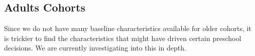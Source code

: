 \documentclass[12pt]{article}
\begin{document}
\subsection{Adults Cohorts}
Since we do not have many baseline characteristics available for older cohorts, it is trickier to find the characteristics that might have driven certain preschool decisions. We are currently investigating into this in depth.

\clearpage
\singlespacing
\listoftables

%
%
%

%
%
%

%
%
%

%
%
%

%
%
%

%
%
%
\end{document}
